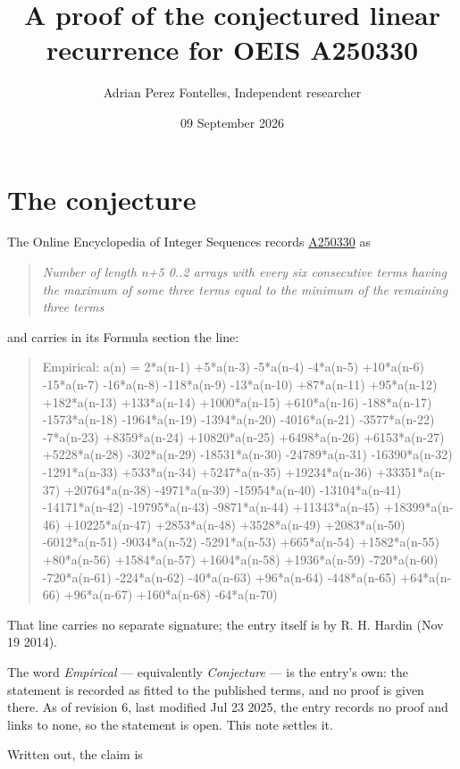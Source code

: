 \documentclass[11pt]{article}
\title{A proof of the conjectured linear recurrence for OEIS A250330}
\author{Adrian Perez Fontelles, Independent researcher}
\date{09 September 2026}
\theoremstyle{definition}
\begin{document}
\maketitle
\section{The conjecture}

The Online Encyclopedia of Integer Sequences records \href{https://oeis.org/A250330}{A250330} as

\begin{quote}\itshape Number of length n+5 0..2 arrays with every six consecutive terms having the maximum of some three terms equal to the minimum of the remaining three terms\end{quote}

and carries in its Formula section the line:

\begin{quote}\ttfamily Empirical: a(n) = 2*a(n-1) +5*a(n-3) -5*a(n-4) -4*a(n-5) +10*a(n-6) -15*a(n-7) -16*a(n-8) -118*a(n-9) -13*a(n-10) +87*a(n-11) +95*a(n-12) +182*a(n-13) +133*a(n-14) +1000*a(n-15) +610*a(n-16) -188*a(n-17) -1573*a(n-18) -1964*a(n-19) -1394*a(n-20) -4016*a(n-21) -3577*a(n-22) -7*a(n-23) +8359*a(n-24) +10820*a(n-25) +6498*a(n-26) +6153*a(n-27) +5228*a(n-28) -302*a(n-29) -18531*a(n-30) -24789*a(n-31) -16390*a(n-32) -1291*a(n-33) +533*a(n-34) +5247*a(n-35) +19234*a(n-36) +33351*a(n-37) +20764*a(n-38) -4971*a(n-39) -15954*a(n-40) -13104*a(n-41) -14171*a(n-42) -19795*a(n-43) -9871*a(n-44) +11343*a(n-45) +18399*a(n-46) +10225*a(n-47) +2853*a(n-48) +3528*a(n-49) +2083*a(n-50) -6012*a(n-51) -9034*a(n-52) -5291*a(n-53) +665*a(n-54) +1582*a(n-55) +80*a(n-56) +1584*a(n-57) +1604*a(n-58) +1936*a(n-59) -720*a(n-60) -720*a(n-61) -224*a(n-62) -40*a(n-63) +96*a(n-64) -448*a(n-65) +64*a(n-66) +96*a(n-67) +160*a(n-68) -64*a(n-70)\end{quote}

That line carries no separate signature; the entry itself is by R. H. Hardin (Nov 19 2014).

The word {\itshape Empirical} --- equivalently {\itshape Conjecture} --- is the entry's own: the statement is recorded as fitted to the published terms, and no proof is given there. As of revision 6, last modified Jul 23 2025, the entry records no proof and links to none, so the statement is open. This note settles it.

Written out, the claim is
\end{document}

